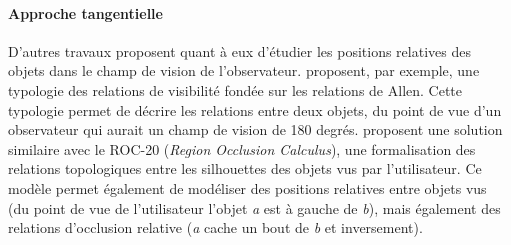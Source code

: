 \paragraph{Approche tangentielle}

D'autres travaux proposent quant à eux d'étudier les positions
relatives des objets dans le champ de vision de l'observateur.
\textcite{Santos2015} proposent, par exemple, une typologie des
relations de visibilité fondée sur les relations de Allen. Cette
typologie permet de décrire les relations entre deux objets, du point
de vue d'un observateur qui aurait un champ de vision de 180 degrés.
\textcite{Randell2001} proposent une solution similaire avec le ROC-20
(\emph{Region Occlusion Calculus}), une formalisation des relations
topologiques entre les silhouettes des objets vus par
l'utilisateur. Ce modèle permet également de modéliser des positions
relatives entre objets vus (\eg du point de vue de l'utilisateur
l'objet \emph{a} est à gauche de \emph{b}), mais également des
relations d'occlusion relative (\eg \emph{a} cache un bout de \emph{b}
et inversement).

